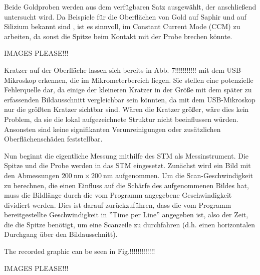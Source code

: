 

Beide Goldproben werden aus dem verfügbaren Satz ausgewählt, der anschließend untersucht wird. Da Beispiele für die Oberflächen von Gold auf Saphir und auf Silizium bekannt sind \cite{praktikum}, ist es sinnvoll, im Constant Current Mode (CCM) zu arbeiten, da sonst die Spitze beim Kontakt mit der Probe brechen könnte.

IMAGES PLEASE!!!

Kratzer auf der Oberfläche lassen sich bereits in Abb. 7!!!!!!!!!!! mit dem USB-Mikroskop erkennen, die im Mikrometerbereich liegen. 
Sie stellen eine potenzielle Fehlerquelle dar, da einige der kleineren Kratzer in der Größe mit dem später zu erfassenden Bildausschnitt vergleichbar sein könnten, da mit dem USB-Mikroskop nur die größten Kratzer sichtbar sind. 
Wären die Kratzer größer, wäre dies kein Problem, da sie die lokal aufgezeichnete Struktur nicht beeinflussen würden. Ansonsten sind keine signifikanten Verunreinigungen oder zusätzlichen Oberflächenschäden feststellbar.

Nun beginnt die eigentliche Messung mithilfe des STM als Messinstrument. Die Spitze und die Probe werden in das STM eingesetzt. Zunächst wird ein Bild mit den Abmessungen $\SI{200}{\nm} \times \SI{200}{\nm}$ aufgenommen. 
Um die Scan-Geschwindigkeit zu berechnen, die einen Einfluss auf die Schärfe des aufgenommenen Bildes hat, muss die Bildlänge durch die vom Programm angegebene Geschwindigkeit dividiert werden. 
Dies ist darauf zurückzuführen, dass die vom Programm bereitgestellte Geschwindigkeit in ''Time per Line'' angegeben ist, also der Zeit, die die Spitze benötigt, um eine Scanzeile zu durchfahren (d.h. einen horizontalen Durchgang über den Bildausschnitt).

The recorded graphic can be seen in Fig.!!!!!!!!!!!!!

IMAGES PLEASE!!!

